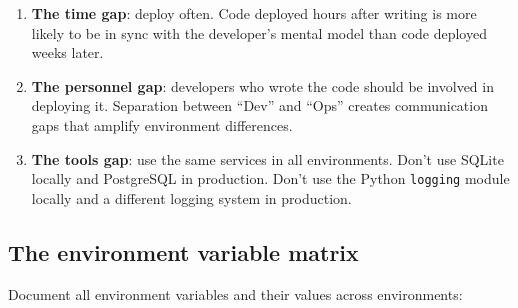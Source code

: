 \begin{enumerate}
\def\labelenumi{\arabic{enumi}.}
\tightlist
\item
  \textbf{The time gap}: deploy often. Code deployed hours after writing is more likely to be in sync with the developer's mental model than code deployed weeks later.
\item
  \textbf{The personnel gap}: developers who wrote the code should be involved in deploying it. Separation between ``Dev'' and ``Ops'' creates communication gaps that amplify environment differences.
\item
  \textbf{The tools gap}: use the same services in all environments. Don't use SQLite locally and PostgreSQL in production. Don't use the Python \texttt{logging} module locally and a different logging system in production.
\end{enumerate}

\subsection*{The environment variable matrix}\label{39-local-vs-production:the-environment-variable-matrix}

Document all environment variables and their values across environments:


